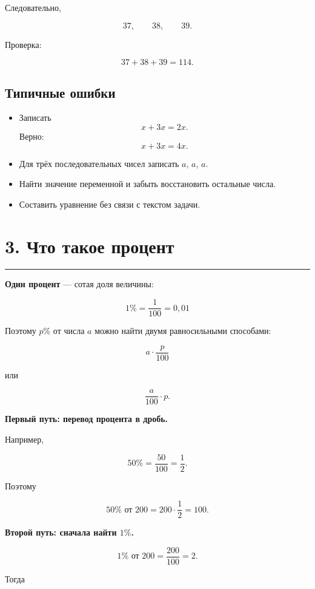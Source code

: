 \documentclass[a4paper,12pt]{article}
\newcommand{\sectionrule}{%
  \par
  \vspace{-0.35em}
  {\color{accent}\rule{\linewidth}{0.7pt}}
  \vspace{0.55em}
}
\newcommand{\term}[1]{\textbf{#1}}
\begin{document}
Следовательно,

\[
37,\qquad38,\qquad39.
\]

Проверка:

\[
37+38+39=114.
\]

\subsection*{Типичные ошибки}

\begin{itemize}
  \item Записать
  \[
  x+3x=2x.
  \]
  Верно:
  \[
  x+3x=4x.
  \]

  \item Для трёх последовательных чисел записать
  $a$, $a$, $a$.

  \item Найти значение переменной и забыть восстановить остальные числа.

  \item Составить уравнение без связи с текстом задачи.
\end{itemize}


\section*{3. Что такое процент}
\sectionrule

\term{Один процент} --- сотая доля величины:

\[
\boxed{
1\%=\frac{1}{100}=0{,}01
}
\]

Поэтому $p\%$ от числа $a$ можно найти двумя
равносильными способами:

\[
\boxed{
a\cdot\frac{p}{100}
}
\]

или

\[
\boxed{
\frac{a}{100}\cdot p
}.
\]

\textbf{Первый путь: перевод процента в дробь.}

Например,

\[
50\%
=
\frac{50}{100}
=
\frac12.
\]

Поэтому

\[
50\%\text{ от }200
=
200\cdot\frac12
=
100.
\]

\textbf{Второй путь: сначала найти $1\%$.}

\[
1\%\text{ от }200
=
\frac{200}{100}
=
2.
\]

Тогда
\end{document}
